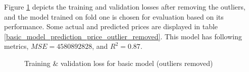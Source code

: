 \documentclass[12pt,twoside]{report}
\begin{document}
Figure \ref{all_full_epoch_1000_outlier_removed} depicts the training and validation losses after removing the outliers, and the model trained on fold one is chosen for evaluation based on its performance. Some actual and predicted prices are displayed in table \ref{basic_model_prediction_price_outlier_removed}. This model has following metrics, $MSE = 4580892828$, and $R^2 = 0.87$. 
\begin{figure}[!htbp]
	\centering
	\hfill
	\hfill
	\hfil
	\hfil
	\caption{Training \& validation loss for basic model (outliers removed)}
	\label{all_full_epoch_1000_outlier_removed}
\end{figure}
\end{document}
